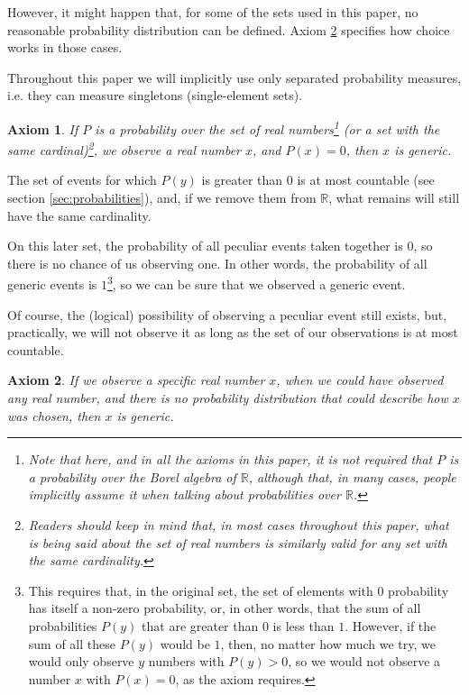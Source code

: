 \documentclass[a4paper
,draft
]{article}
\def\reale{\mathbb{R}}
\newcommand{\paper}[1]{paper}
\newtheorem{axiom}{Axiom}
\begin{document}
However, it might happen that, for some of the sets used in this \paper{},
no reasonable probability distribution can be defined.
Axiom \ref{ax:noprobability} specifies how choice works in those cases.

Throughout this paper we will implicitly use only separated probability
measures, i.e. they can measure singletons (single-element sets).

\begin{axiom}
  \label{ax:zeroisgeneric}
  If $P$ is a probability over the set of real numbers\footnote{Note
    that here, and in all the axioms in this paper, it is not required that
    $P$ is a probability over the
    Borel algebra of $\reale$, although that, in many cases, people implicitly
    assume it when talking about probabilities over $\reale$.
  }
  (or a set with the same cardinal)\footnote{
    Readers should
    keep in mind that, in most cases throughout this paper, what is being said
    about the set of real numbers is similarly valid for any set with the same
    cardinality.},
  we observe a real number $x$, and $P(x)=0$, then $x$ is generic.
\end{axiom}

The set of events for which $P(y)$ is
greater than $0$ is at most countable (see section \ref{sec:probabilities}),
and, if we remove them from $\reale$, what remains will still have
the same cardinality.

On this later set, the probability
of all peculiar events taken together is $0$, so there is no chance of us
observing one.
In other words, the probability of all generic events is $1$\footnote{This
  requires that, in the original set, the set of elements with $0$ probability
  has itself a non-zero probability, or, in other words, that the sum of all
  probabilities $P(y)$ that are greater than $0$ is less than $1$.
  However, if the sum of all these $P(y)$ would be $1$, then, no matter how much
  we try, we would only observe $y$ numbers with $P(y) > 0$,
  so we would not observe a number $x$ with $P(x)=0$,
  as the axiom requires.
},
so we can be sure that we observed a generic event.

Of course, the (logical) possibility of observing a peculiar event still exists,
but, practically, we will not observe it as long as the set of our
observations is at most countable.

\begin{axiom}\label{ax:noprobability}
  If we observe a specific real number $x$, when we could have
  observed any real number, and there is no probability distribution that could
  describe how $x$ was chosen, then $x$ is generic.
\end{axiom}
\end{document}
